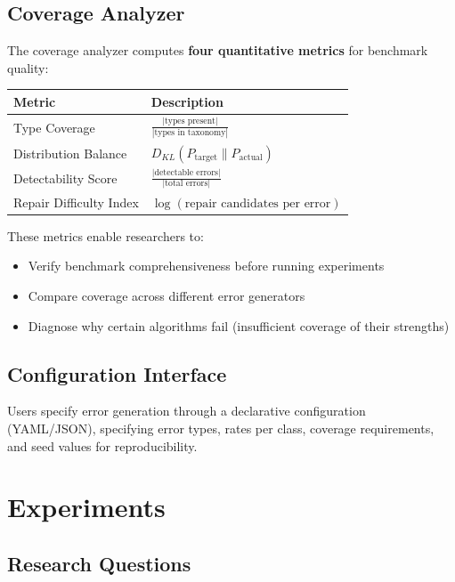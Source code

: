 \documentclass[11pt,a4paper]{article}
\begin{document}
\subsection{Coverage Analyzer}

The coverage analyzer computes \textbf{four quantitative metrics} for benchmark quality:

\begin{table}[h]
\centering
\begin{tabular}{lp{6cm}}
\toprule
Metric & Description \\
\midrule
Type Coverage & $\frac{|\text{types present}|}{|\text{types in taxonomy}|}$ \\
Distribution Balance & $D_{KL}(P_{\text{target}} \| P_{\text{actual}})$ \\
Detectability Score & $\frac{|\text{detectable errors}|}{|\text{total errors}|}$ \\
Repair Difficulty Index & $\log(\text{repair candidates per error})$ \\
\bottomrule
\end{tabular}
\end{table}

These metrics enable researchers to:
\begin{itemize}
    \item Verify benchmark comprehensiveness before running experiments
    \item Compare coverage across different error generators
    \item Diagnose why certain algorithms fail (insufficient coverage of their strengths)
\end{itemize}

\subsection{Configuration Interface}

Users specify error generation through a declarative configuration (YAML/JSON), specifying error types, rates per class, coverage requirements, and seed values for reproducibility.

\section{Experiments}
\label{sec:experiments}

\subsection{Research Questions}
\end{document}
